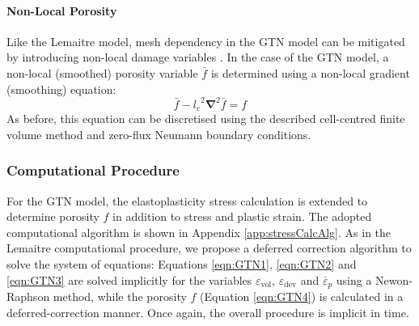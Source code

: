 \documentclass[sn-mathphys,Numbered]{sn-jnl}%
\newcommand{\bb}{\boldsymbol}
\begin{document}
\paragraph{Non-Local Porosity}

Like the Lemaitre model, mesh dependency in the GTN model can be mitigated by introducing non-local damage variables \cite{reusch_non-local_2003, leclerc_micromechanics-based_2020}.
In the case of the GTN model, a non-local (smoothed) porosity variable $\bar{f}$ is determined using a non-local gradient (smoothing) equation:
\begin{equation}
	\bar{f} - {l_c}^2 \bb{\nabla}^2 \bar{f} = f
\end{equation}
As before, this equation can be discretised using the described cell-centred finite volume method and zero-flux Neumann boundary conditions.



\subsubsection{Computational Procedure}

For the GTN model, the elastoplasticity stress calculation is extended to determine porosity $f$ in addition to stress and plastic strain.
The adopted computational algorithm is shown in Appendix \ref{app:stressCalcAlg}. %
As in the Lemaitre computational procedure, we propose a deferred correction algorithm to solve the system of equations:
Equations \ref{eqn:GTN1}, \ref{eqn:GTN2} and \ref{eqn:GTN3} are solved implicitly for the variables ${\varepsilon}_\text{vol}$, ${\varepsilon}_\text{dev}$ and $\overline{{\varepsilon}}_p$ using a Newon-Raphson method, while the porosity $f$ (Equation \ref{eqn:GTN4}) is calculated in a deferred-correction manner.
Once again, the overall procedure is implicit in time.
\end{document}
